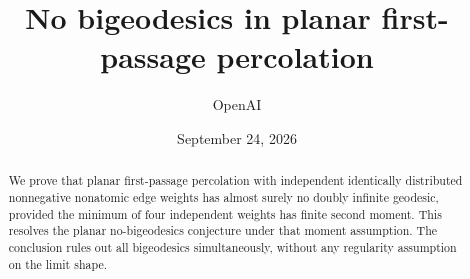 \documentclass[11pt]{amsart}
\title{No bigeodesics in planar first-passage percolation}
\author{OpenAI}
\date{September 24, 2026}
\theoremstyle{definition}
\theoremstyle{remark}
\begin{document}
\begin{abstract}
We prove that planar first-passage percolation with independent identically
distributed nonnegative nonatomic edge weights has almost surely no doubly infinite
geodesic, provided the minimum of four independent weights has finite second
moment. This resolves the planar no-bigeodesics conjecture under that moment
assumption. The conclusion rules out all bigeodesics simultaneously, without
any regularity assumption on the limit shape.
\end{abstract}
\maketitle

\clearpage
\tableofcontents







\appendix


\end{document}
